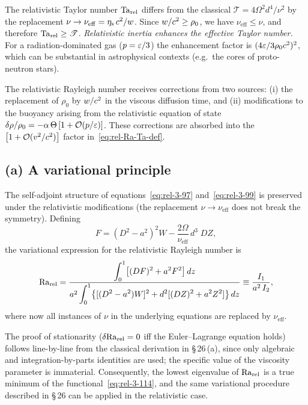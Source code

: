 \begin{relcorrection}
The relativistic Taylor number $\mathrm{Ta}_{\mathrm{rel}}$ differs from the classical
$\mathscr{T} = 4\Omega^2 d^4/\nu^2$ by the replacement
$\nu \to \nu_{\mathrm{eff}} = \eta_{\mathrm{s}}\,c^2/w$.  Since
$w/c^2 \geq \rho_0$, we have $\nu_{\mathrm{eff}} \leq \nu$,
and therefore $\mathrm{Ta}_{\mathrm{rel}} \geq \mathscr{T}$.  \emph{Relativistic inertia
enhances the effective Taylor number.}  For a radiation-dominated gas
($p = \varepsilon/3$) the enhancement factor is
$(4\varepsilon/3\rho_0 c^2)^2$, which can be substantial in
astrophysical contexts (e.g.\ the cores of proto-neutron stars).
\end{relcorrection}

The relativistic Rayleigh number receives corrections from two sources:
(i) the replacement of $\rho_0$ by $w/c^2$ in the viscous
diffusion time, and (ii) modifications to the buoyancy arising from the
relativistic equation of state $\delta\rho/\rho_0 =
-\alpha\,\Theta\,[1 + \mathcal{O}(p/\varepsilon)]$.  These corrections are
absorbed into the $\left[1 + \mathcal{O}(v^2/c^2)\right]$ factor in~\eqref{eq:rel-Ra-Ta-def}.

\subsection*{(a) A variational principle}

The self-adjoint structure of equations~\eqref{eq:rel-3-97}
and~\eqref{eq:rel-3-99} is preserved under the relativistic
modifications (the replacement $\nu \to \nu_{\mathrm{eff}}$ does not
break the symmetry).  Defining
\begin{equation}\label{eq:rel-3-104}
  F = (D^2 - a^2)^2 W
    - \frac{2\Omega}{\nu_{\mathrm{eff}}}\,d^3\;DZ,
\end{equation}
the variational expression for the relativistic Rayleigh number is
\begin{equation}\label{eq:rel-3-114}
  \mathrm{Ra}_{\mathrm{rel}}
  = \frac{\displaystyle\int_0^1 \bigl[(DF)^2 + a^2 F^2\bigr]\,dz}
         {a^2\displaystyle\int_0^1
           \bigl\{[(D^2-a^2)W]^2
             + d^2[(DZ)^2 + a^2 Z^2]\bigr\}\,dz}
  \equiv \frac{I_1}{a^2\,I_2},
\end{equation}
where now all instances of $\nu$ in the underlying equations are
replaced by $\nu_{\mathrm{eff}}$.

The proof of stationarity ($\delta\mathrm{Ra}_{\mathrm{rel}} = 0$ iff the Euler--Lagrange
equation holds) follows line-by-line from the classical derivation in
\S\,26\,(a), since only algebraic and integration-by-parts identities
are used; the specific value of the viscosity parameter is immaterial.
Consequently, the lowest eigenvalue of $\mathrm{Ra}_{\mathrm{rel}}$ is a true minimum of the
functional~\eqref{eq:rel-3-114}, and the same variational procedure
described in \S\,26 can be applied in the relativistic case.


